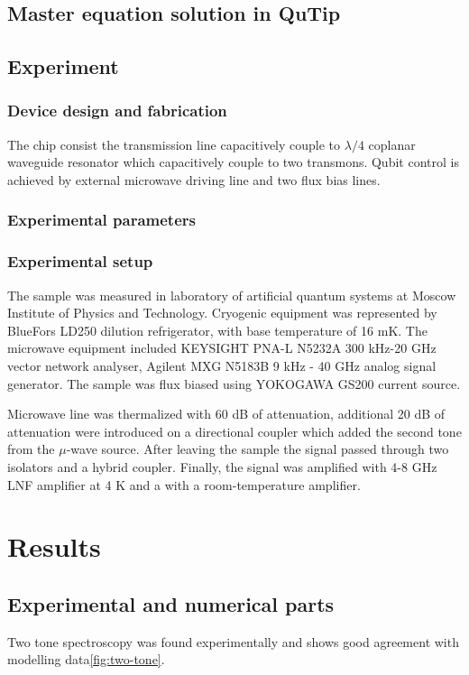 \documentclass[%
 aip,
 amsmath,amssymb,
 reprint,%
]{revtex4-1}
\begin{document}
\subsection{Master equation solution in QuTip}

\subsection{Experiment}
\subsubsection{Device design and fabrication}
The chip consist the transmission line capacitively couple to $\lambda/4$ coplanar waveguide resonator which capacitively couple to two transmons. Qubit control is achieved by external microwave driving line and two flux bias lines. 
\subsubsection{Experimental parameters}
\subsubsection{Experimental setup}
The sample was measured in laboratory of artificial quantum systems at Moscow Institute of Physics and Technology. Cryogenic equipment was
represented by BlueFors LD250 dilution refrigerator, with base temperature of 16 mK. The microwave equipment included KEYSIGHT PNA-L N5232A 300 kHz-20 GHz vector network analyser, Agilent MXG N5183B 9 kHz - 40 GHz analog signal generator. The sample was 
flux biased using YOKOGAWA GS200 current source.

Microwave line was thermalized with 60 dB of attenuation, additional 20 dB of attenuation were introduced on a directional coupler which added the second tone from the $\mu$-wave source. After leaving the sample the signal passed through two isolators and a hybrid coupler. Finally, the signal was amplified with 4-8 GHz LNF amplifier at 4 K and a with a room-temperature amplifier.

\section{Results}
\subsection{\label{sec:level1} Experimental and numerical parts}
Two tone spectroscopy was found experimentally and shows good agreement with modelling data\autoref{fig:two-tone}. 
\end{document}
